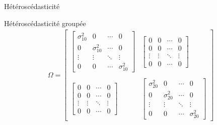 \documentclass{beamer}
\begin{document}
\begin{frame}{Hétéroscédasticité}
\begin{block}{Hétéroscédasticité groupée}
\begin{align*}
\Omega=\begin{bmatrix}
\begin{bmatrix}
\sigma_{10}^2 & 0 & \cdots  & 0 \\ 
0 & \sigma_{10}^2  & \cdots & 0 \\ 
\vdots & \vdots & \ddots & \vdots \\ 
0 & 0 & \cdots & \sigma_{10}^2
\end{bmatrix} & \begin{bmatrix}
0 & 0 & \cdots  & 0 \\ 
0 & 0  & \cdots & 0 \\ 
\vdots & \vdots & \ddots & \vdots \\ 
0 & 0 & \cdots & 0
\end{bmatrix} \\ \\
 \begin{bmatrix}
0 & 0 & \cdots  & 0 \\ 
0 & 0  & \cdots & 0 \\ 
\vdots & \vdots & \ddots & \vdots \\ 
0 & 0 & \cdots & 0
\end{bmatrix} & \begin{bmatrix}
\sigma_{20}^2 & 0 & \cdots  & 0 \\ 
0 & \sigma_{20}^2  & \cdots & 0 \\ 
\vdots & \vdots & \ddots & \vdots \\ 
0 & 0 & \cdots & \sigma_{20}^2
\end{bmatrix} 
\end{bmatrix}
\end{align*}
\end{block}
\end{frame}
\end{document}
